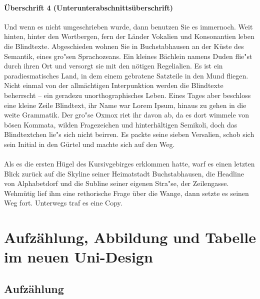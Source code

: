 \subsubsection{Überschrift 4 (Unterunterabschnittsüberschrift)}

Und wenn es nicht umgeschrieben wurde, dann benutzen Sie es immernoch. Weit hinten, hinter den Wortbergen, fern der Länder Vokalien und Konsonantien leben die Blindtexte. Abgeschieden wohnen Sie in Buchstabhausen an der Küste des Semantik, eines gro"sen Sprachozeans. Ein kleines Bächlein namens Duden flie"st durch ihren Ort und versorgt sie mit den nötigen Regelialien. Es ist ein paradiesmatisches Land, in dem einem gebratene Satzteile in den Mund fliegen. Nicht einmal von der allmächtigen Interpunktion werden die Blindtexte beherrscht – ein geradezu unorthographisches Leben. Eines Tages aber beschloss eine kleine Zeile Blindtext, ihr Name war Lorem Ipsum, hinaus zu gehen in die weite Grammatik. Der gro"se Oxmox riet ihr davon ab, da es dort wimmele von bösen Kommata, wilden Fragezeichen und hinterhältigen Semikoli, doch das Blindtextchen lie"s sich nicht beirren. Es packte seine sieben Versalien, schob sich sein Initial in den Gürtel und machte sich auf den Weg.\\
\\
Als es die ersten Hügel des Kursivgebirges erklommen hatte, warf es einen letzten Blick zurück auf die Skyline seiner Heimatstadt Buchstabhausen, die Headline von Alphabetdorf und die Subline seiner eigenen Stra"se, der Zeilengasse. Wehmütig lief ihm eine rethorische Frage über die Wange, dann setzte es seinen Weg fort. Unterwegs traf es eine Copy.

\normalsize

\chapter{Aufzählung, Abbildung und Tabelle im neuen Uni-Design}




%
%
%
%

\section{Aufzählung}

